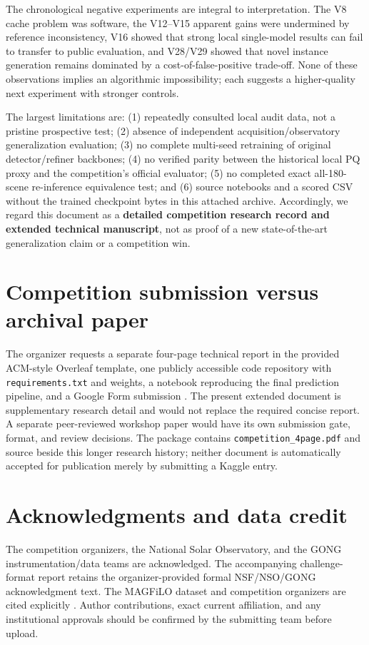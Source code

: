 \documentclass[11pt,a4paper]{article}
\begin{document}
The chronological negative experiments are integral to interpretation. The V8 cache problem was software, the V12--V15 apparent gains were undermined by reference inconsistency, V16 showed that strong local single-model results can fail to transfer to public evaluation, and V28/V29 showed that novel instance generation remains dominated by a cost-of-false-positive trade-off. None of these observations implies an algorithmic impossibility; each suggests a higher-quality next experiment with stronger controls.

The largest limitations are: (1) repeatedly consulted local audit data, not a pristine prospective test; (2) absence of independent acquisition/observatory generalization evaluation; (3) no complete multi-seed retraining of original detector/refiner backbones; (4) no verified parity between the historical local PQ proxy and the competition's official evaluator; (5) no completed exact all-180-scene re-inference equivalence test; and (6) source notebooks and a scored CSV without the trained checkpoint bytes in this attached archive. Accordingly, we regard this document as a \textbf{detailed competition research record and extended technical manuscript}, not as proof of a new state-of-the-art generalization claim or a competition win.

\section{Competition submission versus archival paper}
The organizer requests a separate four-page technical report in the provided ACM-style Overleaf template, one publicly accessible code repository with \texttt{requirements.txt} and weights, a notebook reproducing the final prediction pipeline, and a Google Form submission \cite{challenge}. The present extended document is supplementary research detail and would not replace the required concise report. A separate peer-reviewed workshop paper would have its own submission gate, format, and review decisions. The package contains \texttt{competition\_4page.pdf} and source beside this longer research history; neither document is automatically accepted for publication merely by submitting a Kaggle entry.

\section*{Acknowledgments and data credit}
The competition organizers, the National Solar Observatory, and the GONG instrumentation/data teams are acknowledged. The accompanying challenge-format report retains the organizer-provided formal NSF/NSO/GONG acknowledgment text. The MAGFiLO dataset and competition organizers are cited explicitly \cite{magfilo,challenge}. Author contributions, exact current affiliation, and any institutional approvals should be confirmed by the submitting team before upload.
\end{document}
